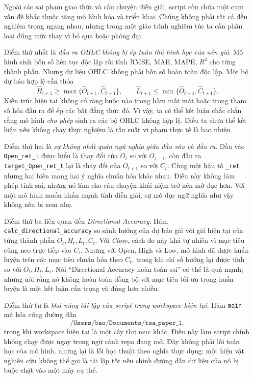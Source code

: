 Ngoài các sai phạm giao thức và câu chuyện diễn giải, script còn chứa một cụm vấn đề khác thuộc tầng mô hình hóa và triển khai. Chúng không phải tất cả đều nghiêm trọng ngang nhau, nhưng trong một giáo trình nghiêm túc ta cần phân loại đúng mức thay vì bỏ qua hoặc phóng đại.

Điểm thứ nhất là \emph{đầu ra OHLC không bị ép tuân thủ hình học của nến giá}. Mô hình sinh bốn số liên tục độc lập rồi tính RMSE, MAE, MAPE, \(R^2\) cho từng thành phần. Nhưng dữ liệu OHLC không phải bốn số hoàn toàn độc lập. Một bộ dự báo hợp lệ cần thỏa
\[
\widehat H_{t+1}\ge \max\{\widehat O_{t+1},\widehat C_{t+1}\},
\qquad
\widehat L_{t+1}\le \min\{\widehat O_{t+1},\widehat C_{t+1}\}.
\]
Kiến trúc hiện tại không có ràng buộc nào trong hàm mất mát hoặc trong tham số hóa đầu ra để ép các bất đẳng thức đó. Vì vậy, ta có thể kết luận chắc chắn rằng mô hình \emph{cho phép} sinh ra các bộ OHLC không hợp lệ. Điều ta chưa thể kết luận nếu không chạy thực nghiệm là tần suất vi phạm thực tế là bao nhiêu.

Điểm thứ hai là \emph{sự không nhất quán ngữ nghĩa giữa đầu vào và đầu ra}. Đầu vào \texttt{Open\_ret\_t} được hiểu là thay đổi của \(O_t\) so với \(O_{t-1}\), còn đầu ra \texttt{target\_Open\_ret\_t} lại là thay đổi của \(O_{t+1}\) so với \(C_t\). Cùng một hậu tố \texttt{\_ret} nhưng hai biến mang hai ý nghĩa chuẩn hóa khác nhau. Điều này không làm phép tính sai, nhưng nó làm cho câu chuyện khái niệm trở nên mờ đục hơn. Với một mô hình muốn nhấn mạnh tính diễn giải, sự mờ đục ngữ nghĩa như vậy không nên bị xem nhẹ.

Điểm thứ ba liên quan đến \emph{Directional Accuracy}. Hàm \texttt{calc\_directional\_accuracy} so sánh hướng của dự báo giá với giá hiện tại của từng thành phần \(O_t,H_t,L_t,C_t\). Với \emph{Close}, cách đo này khá tự nhiên vì mục tiêu cũng neo trực tiếp vào \(C_t\). Nhưng với Open, High và Low, mô hình đã được huấn luyện trên các mục tiêu chuẩn hóa theo \(C_t\), trong khi chỉ số hướng lại được tính so với \(O_t,H_t,L_t\). Nói ``Directional Accuracy hoàn toàn sai'' có thể là quá mạnh; nhưng nói rằng nó không hoàn toàn đồng bộ với mục tiêu tối ưu trong huấn luyện là một kết luận cẩn trọng và đúng hơn nhiều.

Điểm thứ tư là \emph{khả năng tái lập của script trong workspace hiện tại}. Hàm \texttt{main} mã hóa cứng đường dẫn
\[
\texttt{/Users/bao/Documents/tsa\_paper\_1},
\]
trong khi workspace hiện tại là một cây thư mục khác. Điều này làm script chính không chạy được ngay trong ngữ cảnh repo đang mở. Đây không phải lỗi toán học của mô hình, nhưng lại là lỗi học thuật theo nghĩa thực dụng: một hiện vật nghiên cứu không thể gọi là tái lập tốt nếu chính đường dẫn dữ liệu của nó bị buộc chặt vào một máy cụ thể.

